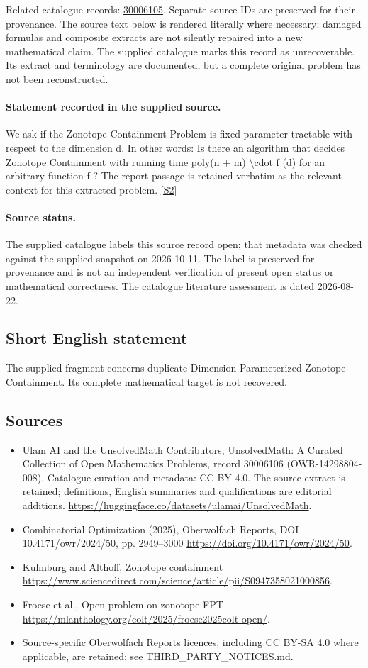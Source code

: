 \documentclass[11pt]{article}
\begin{document}
Related catalogue records: \href{https://mehmetmars7.github.io/Erdosproblems-llm-hunter/problem.html?type=open_problems&id=30006105}{30006105}. Separate source IDs are preserved for their provenance.
The source text below is rendered literally where necessary; damaged formulas and composite extracts are not silently repaired into a new mathematical claim.
The supplied catalogue marks this record as unrecoverable. Its extract and terminology are documented, but a complete original problem has not been reconstructed.
\paragraph{Statement recorded in the supplied source.}
We ask if the Zonotope Containment Problem is fixed-parameter tractable with respect to the dimension d. In other words: Is there an algorithm that decides Zonotope Containment with running time poly(n + m) \textbackslash{}cdot f (d) for an arbitrary function f ? The report passage is retained verbatim as the relevant context for this extracted problem. \href{https://doi.org/10.4171/owr/2024/50}{[S2]}
\paragraph{Source status.}
The supplied catalogue labels this source record open; that metadata was checked against the supplied snapshot on 2026-10-11. The label is preserved for provenance and is not an independent verification of present open status or mathematical correctness. The catalogue literature assessment is dated 2026-08-22.
\subsection{Short English statement}
The supplied fragment concerns duplicate Dimension-Parameterized Zonotope Containment. Its complete mathematical target is not recovered.
\subsection{Sources}
\begin{itemize}
\item[S1] Ulam AI and the UnsolvedMath Contributors, UnsolvedMath: A Curated Collection of Open Mathematics Problems, record 30006106 (OWR-14298804-008). Catalogue curation and metadata: CC BY 4.0. The source extract is retained; definitions, English summaries and qualifications are editorial additions.
\url{https://huggingface.co/datasets/ulamai/UnsolvedMath}.
\item[S2] Combinatorial Optimization (2025), Oberwolfach Reports, DOI 10.4171/owr/2024/50, pp. 2949--3000
\url{https://doi.org/10.4171/owr/2024/50}.
\item[S3] Kulmburg and Althoff, Zonotope containment
\url{https://www.sciencedirect.com/science/article/pii/S0947358021000856}.
\item[S4] Froese et al., Open problem on zonotope FPT
\url{https://mlanthology.org/colt/2025/froese2025colt-open/}.
\item Source-specific Oberwolfach Reports licences, including CC BY-SA 4.0 where applicable, are retained; see THIRD\_PARTY\_NOTICES.md.
\end{itemize}
\end{document}
